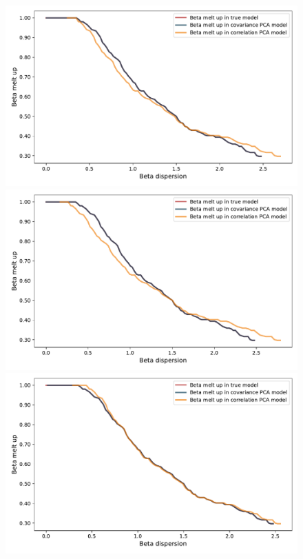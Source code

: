 \documentclass[leqno,12pt]{article}
\begin{document}
{\begin{figure}[htp]
\begin{center}
  \includegraphics[scale=0.33]{img/DispersionvsMeltup1factorsN512T256fvol16minsvol10maxsvol40}
  \includegraphics[scale=0.33]{img/DispersionvsMeltup1factorsN512T256fvol25minsvol10maxsvol40}
  \includegraphics[scale=0.33]{img/DispersionvsMeltup1factorsN512T256fvol16minsvol30maxsvol90}

\end{center}
\end{figure}}
\end{document}
